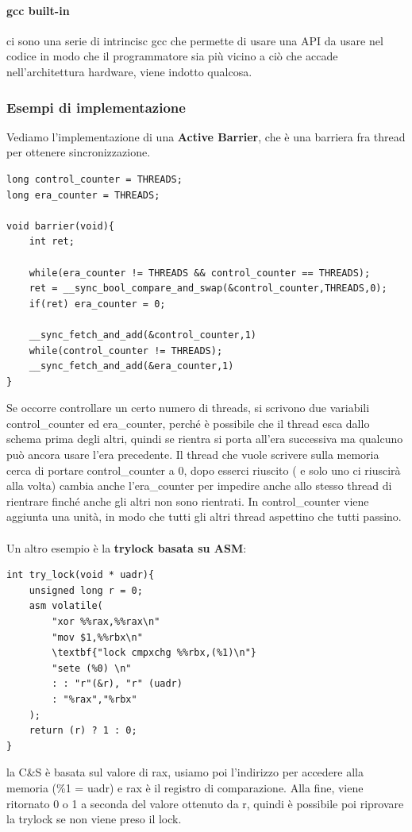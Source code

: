 \documentclass[12pt, oneside]{extbook}
\begin{document}
\paragraph{gcc built-in}ci sono una serie di intrincisc gcc che permette di usare una API da usare nel codice in modo che il programmatore sia più vicino a ciò che accade nell'architettura hardware, viene indotto qualcosa.
\subsubsection{Esempi di implementazione}
Vediamo l'implementazione di una \textbf{Active Barrier}, che è una barriera fra thread per ottenere sincronizzazione. 
\begin{lstlisting}
long control_counter = THREADS;
long era_counter = THREADS;

void barrier(void){
	int ret;
	
	while(era_counter != THREADS && control_counter == THREADS);
	ret = __sync_bool_compare_and_swap(&control_counter,THREADS,0);
	if(ret) era_counter = 0;
	
	__sync_fetch_and_add(&control_counter,1)
	while(control_counter != THREADS);
	__sync_fetch_and_add(&era_counter,1)
}
\end{lstlisting}
Se occorre controllare un certo numero di threads, si scrivono due variabili control\_counter ed era\_counter, perché è possibile che il thread esca dallo schema prima degli altri, quindi se rientra si porta all'era successiva ma qualcuno può ancora usare l'era precedente. Il thread che vuole scrivere sulla memoria cerca di portare control\_counter a 0, dopo esserci riuscito ( e solo uno ci riuscirà alla volta) cambia anche l'era\_counter per impedire anche allo stesso thread di rientrare finché anche gli altri non sono rientrati. In control\_counter viene aggiunta una unità, in modo che tutti gli altri thread aspettino che tutti passino.\\\\
Un altro esempio è la \textbf{trylock basata su ASM}:\\
\begin{lstlisting}
int try_lock(void * uadr){
	unsigned long r = 0;
	asm volatile(
		"xor %%rax,%%rax\n"
		"mov $1,%%rbx\n"
		\textbf{"lock cmpxchg %%rbx,(%1)\n"}
		"sete (%0) \n"
		: : "r"(&r), "r" (uadr)
		: "%rax","%rbx"	
	);
	return (r) ? 1 : 0;
}
\end{lstlisting}
la C\&S è basata sul valore di rax, usiamo poi l'indirizzo per accedere alla memoria (\%1 = uadr) e rax è il registro di comparazione. Alla fine, viene ritornato 0 o 1 a seconda del valore ottenuto da r, quindi è possibile poi riprovare la trylock se non viene preso il lock.
\end{document}
